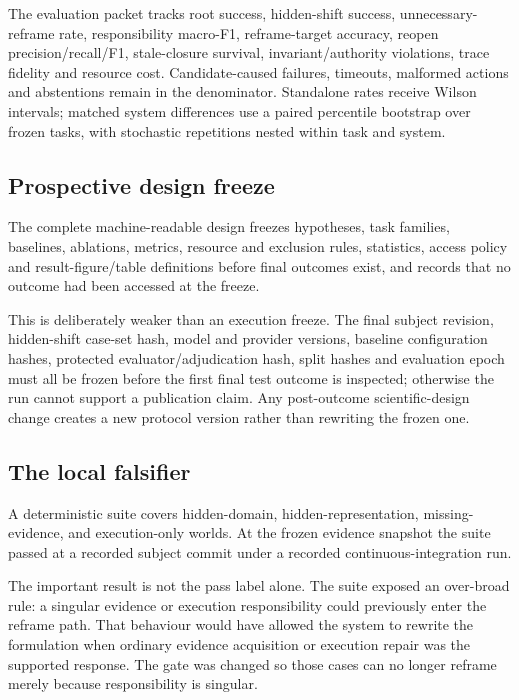 The evaluation packet tracks root success, hidden-shift success,
unnecessary-reframe rate, responsibility macro-F1, reframe-target accuracy,
reopen precision/recall/F1, stale-closure survival, invariant/authority
violations, trace fidelity and resource cost. Candidate-caused failures,
timeouts, malformed actions and abstentions remain in the denominator.
Standalone rates receive Wilson intervals; matched system differences use a
paired percentile bootstrap over frozen tasks, with stochastic repetitions
nested within task and system.

\subsection{Prospective design freeze}

The complete machine-readable design freezes hypotheses, task families,
baselines, ablations, metrics, resource and exclusion rules, statistics, access
policy and result-figure/table definitions before final outcomes exist, and
records that no outcome had been accessed at the freeze.

This is deliberately weaker than an execution freeze. The final subject
revision, hidden-shift case-set hash, model and provider versions, baseline
configuration hashes, protected evaluator/adjudication hash, split hashes and
evaluation epoch must all be frozen before the first final test outcome is
inspected; otherwise the run cannot support a publication claim. Any
post-outcome scientific-design change creates a new protocol version rather than
rewriting the frozen one.

\subsection{The local falsifier}

A deterministic suite covers hidden-domain, hidden-representation,
missing-evidence, and execution-only worlds. At the frozen evidence snapshot the
suite passed at a recorded subject commit under a recorded continuous-integration
run.

The important result is not the pass label alone. The suite exposed an
over-broad rule: a singular evidence or execution responsibility could
previously enter the reframe path. That behaviour would have allowed the system
to rewrite the formulation when ordinary evidence acquisition or execution
repair was the supported response. The gate was changed so those cases can no
longer reframe merely because responsibility is singular.


